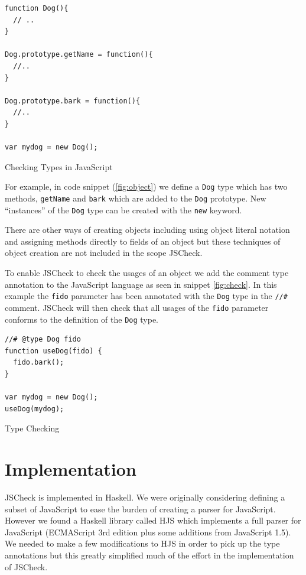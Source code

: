 \documentclass{article}
\begin{document}
\begin{program}
\begin{verbatim}
function Dog(){
  // ..
}

Dog.prototype.getName = function(){
  //..
}

Dog.prototype.bark = function(){
  //..
}

var mydog = new Dog();
\end{verbatim}
\caption{Checking Types in JavaScript}
\label{fig:object}
\end{program}

For example, in code snippet (\ref{fig:object}) we define a {\tt Dog} type
which has two methods, {\tt getName} and {\tt bark} which are added to the {\tt Dog}
prototype. New ``instances'' of the {\tt Dog} type can be created with the {\tt new}
keyword.

There are other ways of creating objects including using object literal notation
and assigning methods directly to fields of an object but these techniques of 
object creation are not included in the scope JSCheck.

To enable JSCheck to check the usages of an object we add the comment type annotation
to the JavaScript language as seen in snippet \ref{fig:check}. In
this example the {\tt fido} parameter has been annotated with the {\tt Dog}
type in the {\tt //\#} comment. JSCheck will then check that all usages of
the {\tt fido} parameter conforms to the definition of the {\tt Dog} type.

\begin{program}
\begin{verbatim}
//# @type Dog fido
function useDog(fido) {
  fido.bark();
}

var mydog = new Dog();
useDog(mydog);
\end{verbatim}
\caption{Type Checking}
\label{fig:check}
\end{program}


\section{Implementation}
\label{sec:implementation}
JSCheck is implemented in Haskell. We were originally considering defining a 
subset of JavaScript to ease the burden of creating a parser for JavaScript. 
However we found a Haskell library called HJS \cite{hjsLibrary} 
which implements a full parser for JavaScript (ECMAScript 3rd edition plus 
some additions from JavaScript 1.5). We needed to make a few modifications to
HJS in order to pick up the type annotations but this greatly simplified much of
the effort in the implementation of JSCheck.
\end{document}

